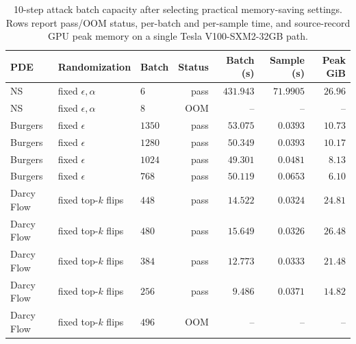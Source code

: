 \documentclass[letterpaper]{article} %
\begin{document}
\begin{table}[t]
\centering
\footnotesize
\caption{10-step attack batch capacity after selecting practical memory-saving
settings. Rows report pass/OOM status, per-batch and per-sample time, and
source-record GPU peak memory on a single Tesla V100-SXM2-32GB path.}
\label{tab:corrected_attack_throughput}
\setlength{\tabcolsep}{2.8pt}
\begin{tabular}{lllrrrr}
\toprule
PDE & Randomization & Batch & Status & Batch (s) & Sample (s) & Peak GiB \\
\midrule
NS & fixed $\epsilon,\alpha$ & $6$ & pass & $431.943$ & $71.9905$ & $26.96$ \\
NS & fixed $\epsilon,\alpha$ & $8$ & OOM & -- & -- & -- \\
Burgers & fixed $\epsilon$ & $1350$ & pass & $53.075$ & $0.0393$ & $10.73$ \\
Burgers & fixed $\epsilon$ & $1280$ & pass & $50.349$ & $0.0393$ & $10.17$ \\
Burgers & fixed $\epsilon$ & $1024$ & pass & $49.301$ & $0.0481$ & $8.13$ \\
Burgers & fixed $\epsilon$ & $768$ & pass & $50.119$ & $0.0653$ & $6.10$ \\
Darcy Flow & fixed top-$k$ flips & $448$ & pass & $14.522$ & $0.0324$ & $24.81$ \\
Darcy Flow & fixed top-$k$ flips & $480$ & pass & $15.649$ & $0.0326$ & $26.48$ \\
Darcy Flow & fixed top-$k$ flips & $384$ & pass & $12.773$ & $0.0333$ & $21.48$ \\
Darcy Flow & fixed top-$k$ flips & $256$ & pass & $9.486$ & $0.0371$ & $14.82$ \\
Darcy Flow & fixed top-$k$ flips & $496$ & OOM & -- & -- & -- \\
\bottomrule
\end{tabular}
\end{table}
\end{document}
